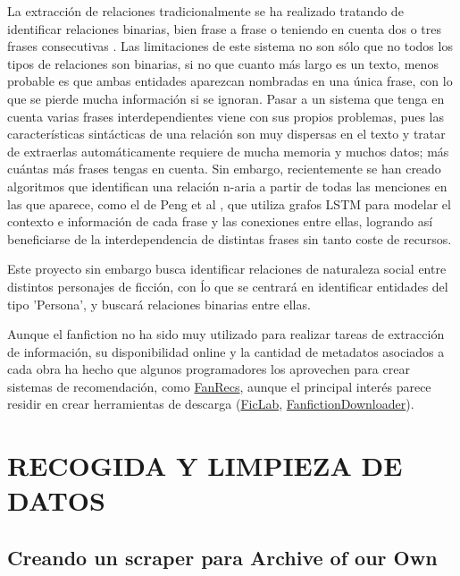 \documentclass{pre-tfg}
\begin{document}
La extracción de relaciones tradicionalmente se ha realizado tratando de identificar relaciones binarias, bien frase a frase o teniendo en cuenta dos o tres frases consecutivas \cite{zelenko_2003}\cite{craven_99}. Las limitaciones de este sistema no son sólo que no todos los tipos de relaciones son binarias, si no que cuanto más largo es un texto, menos probable es que ambas entidades aparezcan nombradas en una única frase, con lo que se pierde mucha información si se ignoran. Pasar a un sistema que tenga en cuenta varias frases interdependientes viene con sus propios problemas, pues las características sintácticas de una relación son muy dispersas en el texto y tratar de extraerlas automáticamente requiere de mucha memoria y muchos datos; más cuántas más frases tengas en cuenta. Sin embargo, recientemente se han creado algoritmos que identifican una relación n-aria a partir de todas las menciones en las que aparece, como el de Peng et al \cite{peng_17}, que utiliza grafos LSTM para modelar el contexto e información de cada frase y las conexiones entre ellas, logrando así beneficiarse de la interdependencia de distintas frases sin tanto coste de recursos.

Este proyecto sin embargo busca identificar relaciones de naturaleza social entre distintos personajes de ficción, con ĺo que se centrará en identificar entidades del tipo 'Persona', y buscará relaciones binarias entre ellas. 

Aunque el fanfiction no ha sido muy utilizado para realizar tareas de extracción de información, su disponibilidad online y la cantidad de metadatos asociados a cada obra ha hecho que algunos programadores los aprovechen para crear sistemas de recomendación, como \href{http://www.fanrecs.com/}{FanRecs}, aunque el principal interés parece residir en crear herramientas de descarga  (\href{https://www.ficlab.com/}{FicLab}, \href{https://www.fanfictiondownloader.net/#/home}{FanfictionDownloader}).



\cleardoublepage
\section{RECOGIDA Y LIMPIEZA DE DATOS}

\subsection{Creando un scraper para Archive of our Own}
\label{sec:recogidadatos}
\end{document}
